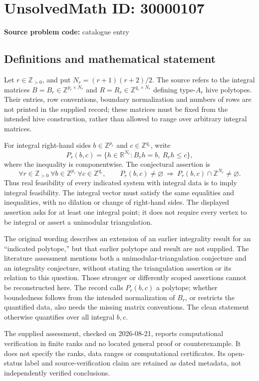 \documentclass[11pt]{article}
\newcommand{\Z}{\mathbb{Z}}
\newcommand{\R}{\mathbb{R}}
\begin{document}
\section*{UnsolvedMath ID: 30000107}
\textbf{Source problem code:} catalogue entry
\subsection{Definitions and mathematical statement}
Let \(r\in\Z_{>0}\), and put \(N_r=(r+1)(r+2)/2\). The source refers to the integral matrices \(B=B_r\in\Z^{p_r\times N_r}\) and \(R=R_r\in\Z^{q_r\times N_r}\) defining type-\(A_r\) hive polytopes. Their entries, row conventions, boundary normalization and numbers of rows are not printed in the supplied record; these matrices must be fixed from the intended hive construction, rather than allowed to range over arbitrary integral matrices.

For integral right-hand sides \(b\in\Z^{p_r}\) and \(c\in\Z^{q_r}\), write
\[
 P_r(b,c)=\{h\in\R^{N_r}:B_rh=b,\ R_rh\leq c\},
\]
where the inequality is componentwise. The conjectural assertion is
\[
 \forall r\in\Z_{>0}\ \forall b\in\Z^{p_r}\ \forall c\in\Z^{q_r},\qquad
 P_r(b,c)\ne\varnothing\ \Longrightarrow\ P_r(b,c)\cap\Z^{N_r}\ne\varnothing.
\]
Thus real feasibility of every indicated system with integral data is to imply integral feasibility. The integral vector must satisfy the same equalities and inequalities, with no dilation or change of right-hand sides. The displayed assertion asks for at least one integral point; it does not require every vertex to be integral or assert a unimodular triangulation.

The original wording describes an extension of an earlier integrality result for an ``indicated polytope,'' but that earlier polytope and result are not supplied. The literature assessment mentions both a unimodular-triangulation conjecture and an integrality conjecture, without stating the triangulation assertion or its relation to this question. Those stronger or differently scoped assertions cannot be reconstructed here. The record calls \(P_r(b,c)\) a polytope; whether boundedness follows from the intended normalization of \(B_r\), or restricts the quantified data, also needs the missing matrix conventions. The clean statement otherwise quantifies over all integral \(b,c\).

The supplied assessment, checked on 2026-08-21, reports computational verification in finite ranks and no located general proof or counterexample. It does not specify the ranks, data ranges or computational certificates. Its open-status label and source-verification claim are retained as dated metadata, not independently verified conclusions.
\end{document}
